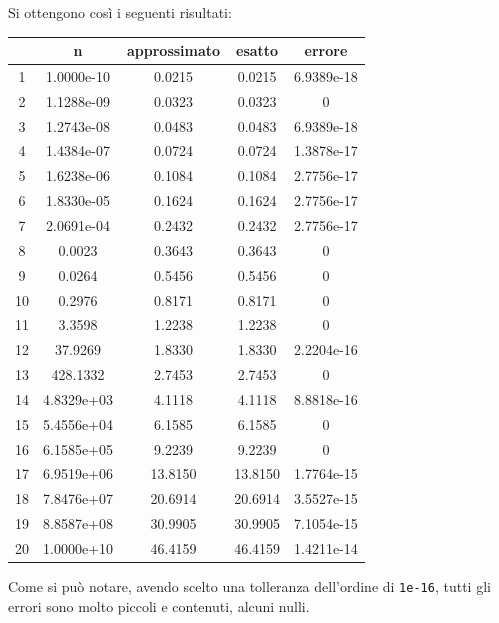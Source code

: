 \documentclass[12pt]{article}
\begin{document}
Si ottengono così i seguenti risultati:
\begin{center}
    \begin{tabular}{||c | c | c | c | c||} 
        \hline
        & n & approssimato & esatto & errore\\
        \hline
        1 & 1.0000e-10 & 0.0215 & 0.0215 & 6.9389e-18\\
        \hline
        2 & 1.1288e-09 & 0.0323 & 0.0323 & 0\\
        \hline
        3 & 1.2743e-08 & 0.0483 & 0.0483 & 6.9389e-18\\
        \hline
        4 & 1.4384e-07 & 0.0724 & 0.0724 & 1.3878e-17\\
        \hline
        5 & 1.6238e-06 & 0.1084 & 0.1084 & 2.7756e-17\\
        \hline
        6 & 1.8330e-05 & 0.1624 & 0.1624 & 2.7756e-17\\
        \hline
        7 & 2.0691e-04 & 0.2432 & 0.2432 & 2.7756e-17\\
        \hline
        8 & 0.0023 & 0.3643 & 0.3643 & 0\\
        \hline
        9 & 0.0264 & 0.5456 & 0.5456 & 0\\
        \hline
        10 & 0.2976 & 0.8171 & 0.8171 & 0\\
        \hline
        11 & 3.3598 & 1.2238 & 1.2238 & 0\\
        \hline
        12 & 37.9269 & 1.8330 & 1.8330 & 2.2204e-16\\
        \hline
        13 & 428.1332 & 2.7453 & 2.7453 & 0\\
        \hline
        14 & 4.8329e+03 & 4.1118 & 4.1118 & 8.8818e-16\\
        \hline
        15 & 5.4556e+04 & 6.1585 & 6.1585 & 0\\
        \hline
        16 & 6.1585e+05 & 9.2239 & 9.2239 & 0\\
        \hline
        17 & 6.9519e+06 & 13.8150 & 13.8150 & 1.7764e-15\\
        \hline
        18 & 7.8476e+07 & 20.6914 & 20.6914 & 3.5527e-15\\
        \hline
        19 & 8.8587e+08 & 30.9905 & 30.9905 & 7.1054e-15\\
        \hline
        20 & 1.0000e+10 & 46.4159 & 46.4159 & 1.4211e-14\\
        \hline
    \end{tabular}
\end{center}
Come si può notare, avendo scelto una tolleranza dell'ordine di \texttt{1e-16}, tutti gli errori sono molto piccoli e contenuti, alcuni nulli.
\pagebreak
\end{document}
